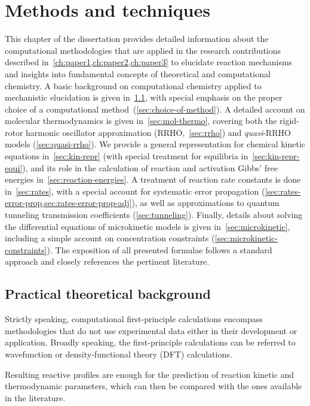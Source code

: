\chapter{Methods and techniques}%
\label{ch:methods}

This chapter of the dissertation provides detailed information about the computational methodologies that are applied in the research contributions described in~\cref{ch:paper1,ch:paper2,ch:paper3} to elucidate reaction mechanisms and insights into fundamental concepts of theoretical and computational chemistry.
A basic background on computational chemistry applied to mechanistic elucidation is given in~\cref{sec:background-methods},
with special emphasis on the proper choice of a computational method~(\cref{sec:choice-of-method}).
A detailed account on molecular thermodynamics is given in~\cref{sec:mol-thermo},
covering both the rigid-rotor harmonic oscillator approximation (RRHO,~\cref{sec:rrho}) and \emph{quasi}-RRHO models (\cref{sec:quasi-rrho}).
We provide a general representation for chemical kinetic equations in~\cref{sec:kin-repr} (with special treatment for equilibria in~\cref{sec:kin-repr-equi}),
and its role in the calculation of reaction and activation Gibbs' free energies in~\cref{sec:reaction-energies}.
A treatment of reaction rate constants is done in~\cref{sec:rates},
with a special account for systematic error propagation (\cref{sec:rates-error-prop,sec:rates-error-prop-adj}),
as well as approximations to quantum tunneling transmission coefficients (\cref{sec:tunneling}).
Finally,
details about solving the differential equations of microkinetic models is given in~\cref{sec:microkinetic},
including a simple account on concentration constraints (\cref{sec:microkinetic-constraints}).
The exposition of all presented formulae follows a standard approach and closely references the pertinent literature.

\section{Practical theoretical background}%
\label{sec:background-methods}

Strictly speaking,
computational first-principle calculations encompass
methodologies that do not use experimental data either in their development or
application.
Broadly speaking,
the first-principle calculations can be referred to
wavefunction or density-functional theory (DFT) calculations.

Resulting reactive profiles are enough for the prediction of reaction kinetic and thermodynamic parameters,
which can then be compared with the ones available in the literature.

